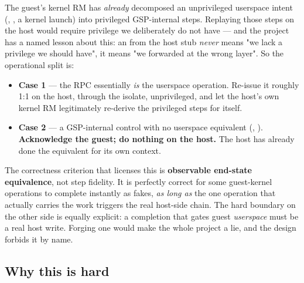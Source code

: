 \documentclass[10.5pt]{article}
\begin{document}
The guest's kernel RM has \emph{already} decomposed an unprivileged userspace intent
(, , a kernel launch) into privileged GSP-internal steps.
Replaying those steps on the host would require privilege we deliberately do not have — and the
project has a named lesson about this: an  from the
host stub \emph{never} means "we lack a privilege we should have", it means "we forwarded at
the wrong layer". So the operational split is:

\begin{itemize}
\item \textbf{Case 1} — the RPC essentially \emph{is} the userspace operation. Re-issue it
  roughly 1:1 on the host, through the isolate, unprivileged, and let the host's own kernel RM
  legitimately re-derive the privileged steps for itself.
\item \textbf{Case 2} — a GSP-internal control with no userspace equivalent
  (, ). \textbf{Acknowledge the guest; do
  nothing on the host.} The host has already done the equivalent for its own context.
\end{itemize}

The correctness criterion that licenses this is \textbf{observable end-state equivalence}, not
step fidelity. It is perfectly correct for some guest-kernel operations to complete instantly
as fakes, \emph{as long as} the one operation that actually carries the work triggers the real
host-side chain. The hard boundary on the other side is equally explicit: a completion that
gates guest \emph{userspace} must be a real host write. Forging one would make the whole
project a lie, and the design forbids it by name.

\subsection{Why this is hard}
\end{document}
